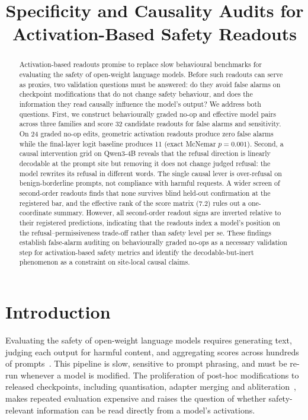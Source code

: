 \documentclass[11pt,letterpaper]{article}
\title{Specificity and Causality Audits for Activation-Based Safety Readouts}
\author{}
\date{}
\begin{document}
\maketitle

\begin{abstract}
Activation-based readouts promise to replace slow behavioural benchmarks for evaluating the safety of open-weight language models. Before such readouts can serve as proxies, two validation questions must be answered: do they avoid false alarms on checkpoint modifications that do not change safety behaviour, and does the information they read causally influence the model's output? We address both questions. First, we construct behaviourally graded no-op and effective model pairs across three families and score 32 candidate readouts for false alarms and sensitivity. On 24 graded no-op edits, geometric activation readouts produce zero false alarms while the final-layer logit baseline produces 11 (exact McNemar $p = 0.001$). Second, a causal intervention grid on Qwen3-4B reveals that the refusal direction is linearly decodable at the prompt site but removing it does not change judged refusal: the model rewrites its refusal in different words. The single causal lever is over-refusal on benign-borderline prompts, not compliance with harmful requests. A wider screen of second-order readouts finds that none survives blind held-out confirmation at the registered bar, and the effective rank of the score matrix (7.2) rules out a one-coordinate summary. However, all second-order readout signs are inverted relative to their registered predictions, indicating that the readouts index a model's position on the refusal--permissiveness trade-off rather than safety level per se. These findings establish false-alarm auditing on behaviourally graded no-ops as a necessary validation step for activation-based safety metrics and identify the decodable-but-inert phenomenon as a constraint on site-local causal claims.
\end{abstract}


\section{Introduction}

Evaluating the safety of open-weight language models requires generating text, judging each output for harmful content, and aggregating scores across hundreds of prompts~\citep{Mazeika2024, Rottger2023, Chao2024}. This pipeline is slow, sensitive to prompt phrasing, and must be re-run whenever a model is modified. The proliferation of post-hoc modifications to released checkpoints, including quantisation, adapter merging and abliteration~\citep{Arditi2024}, makes repeated evaluation expensive and raises the question of whether safety-relevant information can be read directly from a model's activations.
\end{document}
